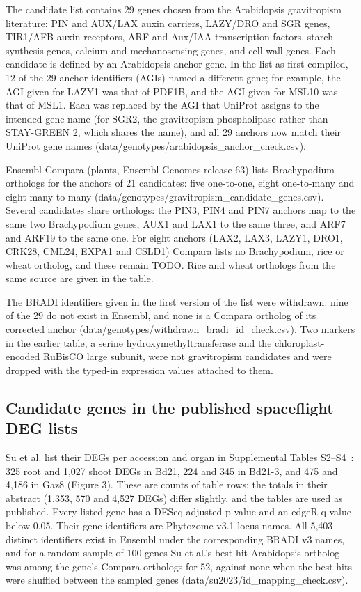 \documentclass[sn-mathphys-num,Basic]{sn-jnl}
\begin{document}
The candidate list contains 29 genes chosen from the Arabidopsis gravitropism literature: PIN and AUX/LAX auxin carriers, LAZY/DRO and SGR genes, TIR1/AFB auxin receptors, ARF and Aux/IAA transcription factors, starch-synthesis genes, calcium and mechanosensing genes, and cell-wall genes. Each candidate is defined by an Arabidopsis anchor gene. In the list as first compiled, 12 of the 29 anchor identifiers (AGIs) named a different gene; for example, the AGI given for LAZY1 was that of PDF1B, and the AGI given for MSL10 was that of MSL1. Each was replaced by the AGI that UniProt assigns to the intended gene name (for SGR2, the gravitropism phospholipase rather than STAY-GREEN 2, which shares the name), and all 29 anchors now match their UniProt gene names (data/genotypes/arabidopsis\_anchor\_check.csv).

Ensembl Compara (plants, Ensembl Genomes release 63) lists Brachypodium orthologs for the anchors of 21 candidates: five one-to-one, eight one-to-many and eight many-to-many (data/genotypes/gravitropism\_candidate\_genes.csv). Several candidates share orthologs: the PIN3, PIN4 and PIN7 anchors map to the same two Brachypodium genes, AUX1 and LAX1 to the same three, and ARF7 and ARF19 to the same one. For eight anchors (LAX2, LAX3, LAZY1, DRO1, CRK28, CML24, EXPA1 and CSLD1) Compara lists no Brachypodium, rice or wheat ortholog, and these remain TODO. Rice and wheat orthologs from the same source are given in the table.

The BRADI identifiers given in the first version of the list were withdrawn: nine of the 29 do not exist in Ensembl, and none is a Compara ortholog of its corrected anchor (data/genotypes/withdrawn\_bradi\_id\_check.csv). Two markers in the earlier table, a serine hydroxymethyltransferase and the chloroplast-encoded RuBisCO large subunit, were not gravitropism candidates and were dropped with the typed-in expression values attached to them.

\subsection{Candidate genes in the published spaceflight DEG lists}

Su et al. list their DEGs per accession and organ in Supplemental Tables S2--S4~\cite{Su2023}: 325 root and 1,027 shoot DEGs in Bd21, 224 and 345 in Bd21-3, and 475 and 4,186 in Gaz8 (Figure 3). These are counts of table rows; the totals in their abstract (1,353, 570 and 4,527 DEGs) differ slightly, and the tables are used as published. Every listed gene has a DESeq adjusted p-value and an edgeR q-value below 0.05. Their gene identifiers are Phytozome v3.1 locus names. All 5,403 distinct identifiers exist in Ensembl under the corresponding BRADI v3 names, and for a random sample of 100 genes Su et al.'s best-hit Arabidopsis ortholog was among the gene's Compara orthologs for 52, against none when the best hits were shuffled between the sampled genes (data/su2023/id\_mapping\_check.csv).
\end{document}
